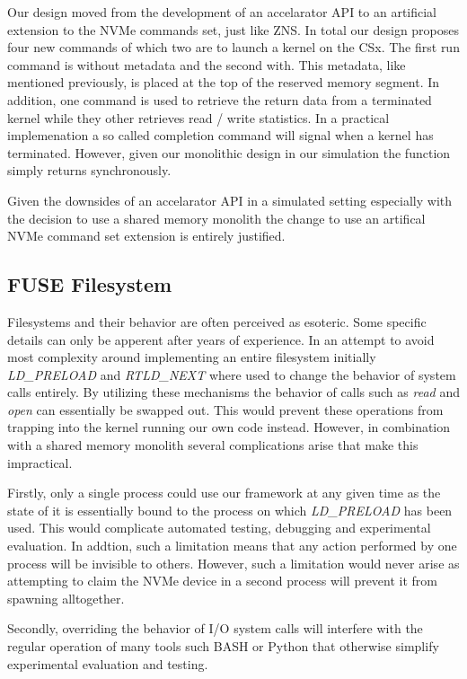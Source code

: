 Our design moved from the development of an accelarator API to an artificial
extension to the NVMe commands set, just like ZNS. In total our design proposes
four new commands of which two are to launch a kernel on the CSx. The first
run command is without metadata and the second with. This metadata, like
mentioned previously, is placed at the top of the reserved memory segment. In
addition, one command is used to retrieve the return data from a terminated
kernel while they other retrieves read / write statistics. In a practical
implemenation a so called completion command will signal when a kernel has
terminated. However, given our monolithic design in our simulation the function
simply returns synchronously.

Given the downsides of an accelarator API in a simulated setting especially
with the decision to use a shared memory monolith the change to use an
artifical NVMe command set extension is entirely justified.

\subsection{FUSE Filesystem}

Filesystems and their behavior are often perceived as esoteric. Some specific
details can only be apperent after years of experience. In an attempt to avoid
most complexity around implementing an entire filesystem initially
\textit{LD\_PRELOAD} and \textit{RTLD\_NEXT} where used to change the behavior
of system calls entirely. By utilizing these mechanisms the behavior of calls
such as \textit{read} and \textit{open} can essentially be swapped out. This
would prevent these operations from trapping into the kernel running our own
code instead. However, in combination with a shared memory monolith several
complications arise that make this impractical.

Firstly, only a single process could use our framework at any given time as the
state of it is essentially bound to the process on which \textit{LD\_PRELOAD}
has been used. This would complicate automated testing, debugging and
experimental evaluation. In addtion, such a limitation means that any action
performed by one process will be invisible to others. However, such a limitation
would never arise as attempting to claim the NVMe device in a second process
will prevent it from spawning alltogether.

Secondly, overriding the behavior of I/O system calls will interfere with the
regular operation of many tools such BASH or Python that otherwise simplify
experimental evaluation and testing.

